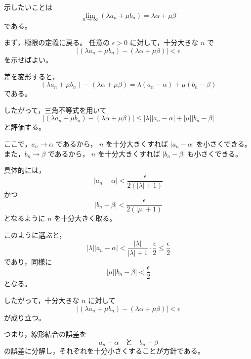 \begin{strategy}
	示したいことは
	\[
		\lim_{n\to\infty}(\lambda a_n+\mu b_n)
		=
		\lambda\alpha+\mu\beta
	\]
	である。

	まず，極限の定義に戻る。
	任意の $\epsilon>0$ に対して，十分大きな $n$ で
	\[
		|(\lambda a_n+\mu b_n)-(\lambda\alpha+\mu\beta)|<\epsilon
	\]
	を示せばよい。

	差を変形すると，
	\[
		(\lambda a_n+\mu b_n)-(\lambda\alpha+\mu\beta)
		=
		\lambda(a_n-\alpha)+\mu(b_n-\beta)
	\]
	である。

	したがって，三角不等式を用いて
	\[
		|(\lambda a_n+\mu b_n)-(\lambda\alpha+\mu\beta)|
		\leq
		|\lambda||a_n-\alpha|
		+
		|\mu||b_n-\beta|
	\]
	と評価する。

	ここで，$a_n\to\alpha$ であるから，
	$n$ を十分大きくすれば $|a_n-\alpha|$ を小さくできる。
	また，$b_n\to\beta$ であるから，
	$n$ を十分大きくすれば $|b_n-\beta|$ も小さくできる。

	具体的には，
	\[
		|a_n-\alpha|<\frac{\epsilon}{2(|\lambda|+1)}
	\]
	かつ
	\[
		|b_n-\beta|<\frac{\epsilon}{2(|\mu|+1)}
	\]
	となるように $n$ を十分大きく取る。

	このように選ぶと，
	\[
		|\lambda||a_n-\alpha|
		<
		\frac{|\lambda|}{|\lambda|+1}\cdot\frac{\epsilon}{2}
		\leq
		\frac{\epsilon}{2}
	\]
	であり，同様に
	\[
		|\mu||b_n-\beta|
		<
		\frac{\epsilon}{2}
	\]
	となる。

	したがって，十分大きな $n$ に対して
	\[
		|(\lambda a_n+\mu b_n)-(\lambda\alpha+\mu\beta)|
		<
		\epsilon
	\]
	が成り立つ。

	つまり，線形結合の誤差を
	\[
		a_n-\alpha
		\quad\text{と}\quad
		b_n-\beta
	\]
	の誤差に分解し，それぞれを十分小さくすることが方針である。
\end{strategy}